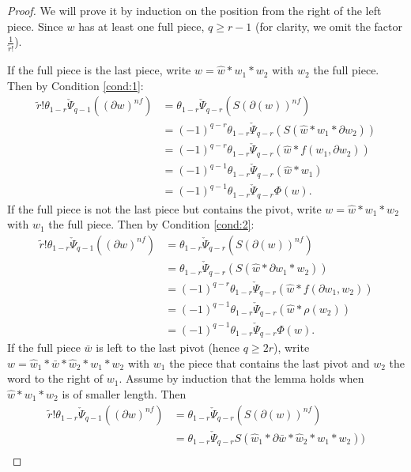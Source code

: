\begin{proof}
	We will prove it by induction on the position from the right of the left piece. Since $w$ has at least one full piece, $q\geq r-1$ (for clarity, we omit the factor $\frac{1}{\tilde{r}!}$).

	If the full piece is the last piece, write $w=\hat{w}*w_1*w_2$ with $w_2$ the full piece. Then by Condition \eqref{cond:1}:
	\begin{align*}
	    \tilde{r}!\theta_{1-r}\check{\Psi}_{q-1}((\partial w)^{nf}) &=
		\theta_{1-r}\check{\Psi}_{q-r}(S(\partial(w))^{nf}) \\
		&= (-1)^{q-r} \theta_{1-r}\check{\Psi}_{q-r}(S(\hat{w}*w_1*\partial w_2)) \\
		&= (-1)^{q-r} \theta_{1-r}\check{\Psi}_{q-r}(\hat{w}*f(w_1,\partial w_2)) \\
		&= (-1)^{q-1} \theta_{1-r}\check{\Psi}_{q-r}(\hat{w}*w_1) \\
		&= (-1)^{q-1} \theta_{1-r}\check{\Psi}_{q-r}\Phi(w).
	\end{align*}
	If the full piece is not the last piece but contains the pivot, write $w=\hat{w}*w_1*w_2$ with $w_1$ the full piece. Then by Condition \eqref{cond:2}:
	\begin{align*}
	    \tilde{r}!\theta_{1-r}\check{\Psi}_{q-1}((\partial w)^{nf}) &=
        \theta_{1-r}\check{\Psi}_{q-r}(S(\partial(w))^{nf}) \\&= \theta_{1-r}\check{\Psi}_{q-r}(S(\hat{w}*\partial w_1* w_2)) \\
		&= (-1)^{q-r} \theta_{1-r}\check{\Psi}_{q-r}(\hat{w}*f(\partial w_1, w_2)) \\
		&= (-1)^{q-1} \theta_{1-r}\check{\Psi}_{q-r}(\hat{w}*\rho(w_2)) \\
		&= (-1)^{q-1} \theta_{1-r}\check{\Psi}_{q-r}\Phi(w).
	\end{align*}
	If the full piece $\bar{w}$ is left to the last pivot (hence $q\geq 2r$), write $w=\hat{w}_1*\bar{w}*\hat{w}_2*w_1*w_2$ with $w_1$ the piece that contains the last pivot and $w_2$ the word to the right of $w_1$. Assume by induction that the lemma holds when $\hat{w}*w_1*w_2$ is of smaller length. Then
	\begin{align*}
		\tilde{r}!\theta_{1-r}\check{\Psi}_{q-1}((\partial w)^{nf}) &=
\theta_{1-r}\check{\Psi}_{q-r}(S(\partial(w))^{nf}) \\
		&= \theta_{1-r}\check{\Psi}_{q-r}S(\hat{w}_1*\partial\bar{w}*\hat{w}_2*w_1*w_2)) \\

\end{align*}
\end{proof}
